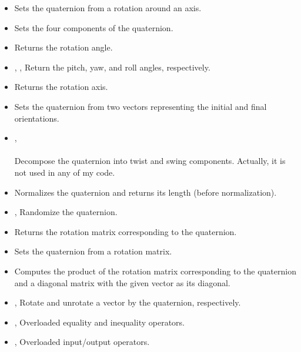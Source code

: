 \documentclass[a4paper,onecolumn,11pt]{doofus}
\begin{document}
\begin{itemize}
\item {} Sets the quaternion from a rotation around an axis.
\item {} Sets the four components of the quaternion.
\item {} Returns the rotation angle.
\item {}, ,  Return the pitch, yaw, and roll angles, respectively.
\item {} Returns the rotation axis.
\item {} Sets the quaternion from two vectors representing the initial and final orientations.
\item {},\\ \\ Decompose the quaternion into twist and swing components. Actually, it is not used in any of my code.
\item {} Normalizes the quaternion and returns its length (before normalization).
\item {},  Randomize the quaternion.
\item {} Returns the rotation matrix corresponding to the quaternion.
\item {} Sets the quaternion from a rotation matrix.
\item {} Computes the product of the rotation matrix corresponding to the quaternion and a diagonal matrix with the given vector as its diagonal.
\item {},  Rotate and unrotate a vector by the quaternion, respectively.
\item {},  Overloaded equality and inequality operators.
\item {},  Overloaded input/output operators.
\end{itemize}
\end{document}
